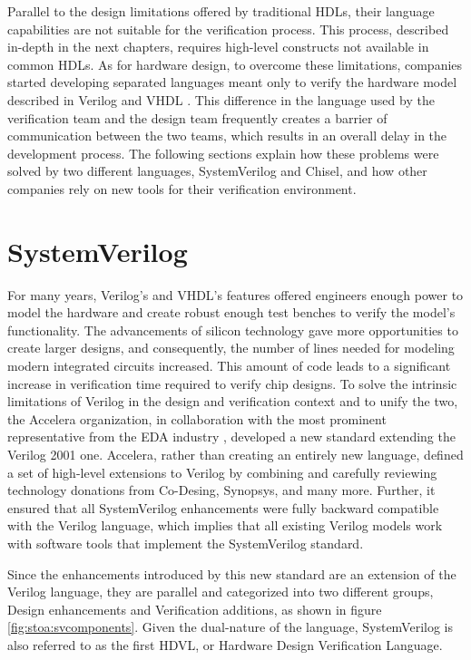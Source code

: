 Parallel to the design limitations offered by traditional HDLs, their language
capabilities are not suitable for the verification process. This process,
described in-depth in the next chapters, requires high-level constructs not
available in common HDLs. As for hardware design, to overcome these limitations,
companies started developing separated languages meant only to verify the
hardware model described in Verilog and VHDL \cite{edwards2004design}. This
difference in the language used by the verification team and the design team
frequently creates a barrier of communication between the two teams, which
results in an overall delay in the development process. The following sections
explain how these problems were solved by two different languages, SystemVerilog
and Chisel, and how other companies rely on new tools for their verification
environment.

\section{SystemVerilog}
For many years, Verilog's and VHDL's features offered engineers enough power to
model the hardware and create robust enough test benches to verify the model's
functionality. The advancements of silicon technology gave more opportunities to
create larger designs, and consequently, the number of lines needed for modeling
modern integrated circuits increased. This amount of code leads to a significant
increase in verification time required to verify chip designs. To solve the
intrinsic limitations of Verilog in the design and verification context and to
unify the two, the Accelera organization, in collaboration with the most
prominent representative from the EDA industry \cite{sutherland2003overview},
developed a new standard extending the Verilog 2001 one. Accelera, rather than
creating an entirely new language, defined a set of high-level extensions to
Verilog by combining and carefully reviewing technology donations from
Co-Desing, Synopsys, and many more. Further, it ensured that all SystemVerilog
enhancements were fully backward compatible with the Verilog language, which
implies that all existing Verilog models work with software tools that implement
the SystemVerilog standard.

Since the enhancements introduced by this new standard are an extension of the
Verilog language, they are parallel and categorized into two different groups,
Design enhancements and Verification additions, as shown in figure
\ref{fig:stoa:svcomponents}. Given the dual-nature of the language,
SystemVerilog is also referred to as the first HDVL, or Hardware Design
Verification Language.



